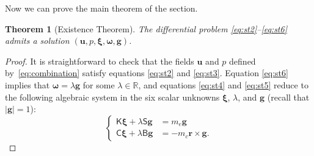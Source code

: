 \documentclass[final]{amsart}
\newtheorem{thm}{Theorem}[section]
\theoremstyle{definition}
\theoremstyle{definition}
\theoremstyle{remark}
\begin{document}
Now we can prove the main theorem of the section.
\begin{thm}[Existence Theorem]\label{thm:sol}
The differential problem \eqref{eq:st2}--\eqref{eq:st6} admits a solution $({\boldsymbol u},p,{\boldsymbol \xi},{\boldsymbol \omega},{\boldsymbol g})$.
\end{thm}
\begin{proof}
  It is straightforward to check that the fields ${\boldsymbol u}$ and $p$
  defined by~\eqref{eq:combination} satisfy equations
  \eqref{eq:st2} and \eqref{eq:st3}. Equation \eqref{eq:st6} implies
  that ${\boldsymbol \omega}=\lambda{\boldsymbol g}$ for some $\lambda\in{\mathbb R}$, and equations
  \eqref{eq:st4} and \eqref{eq:st5} reduce to the following algebraic
  system in the six scalar unknowns ${\boldsymbol \xi}$, $\lambda$, and ${\boldsymbol g}$
  (recall that $|{\boldsymbol g}|=1$):
\begin{equation}\label{eq:algsys}
\left\{
\begin{aligned}
{\mathsf K}{\boldsymbol \xi}+\lambda{\mathsf S}{\boldsymbol g}&\mbox{}=m_e{\boldsymbol g}\\
{\mathsf C}{\boldsymbol \xi}+\lambda{\mathsf B}{\boldsymbol g}&\mbox{}=-m_c{\boldsymbol r}\times{\boldsymbol g}.
\end{aligned}
\right.
\end{equation}


\end{proof}
\end{document}
